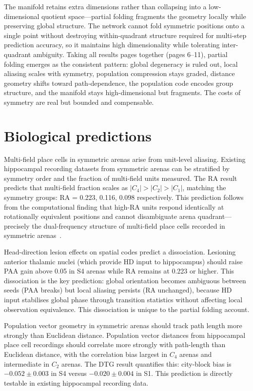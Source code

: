 \documentclass[11pt, a4paper]{article}
\begin{document}
\noindent The manifold retains extra dimensions rather than collapsing into a low-dimensional quotient space---partial folding fragments the geometry locally while preserving global structure. The network cannot fold symmetric positions onto a single point without destroying within-quadrant structure required for multi-step prediction accuracy, so it maintains high dimensionality while tolerating inter-quadrant ambiguity. Taking all results pages together (pages 6--11), partial folding emerges as the consistent pattern: global degeneracy is ruled out, local aliasing scales with symmetry, population compression stays graded, distance geometry shifts toward path-dependence, the population code encodes group structure, and the manifold stays high-dimensional but fragments. The costs of symmetry are real but bounded and compensable.

\clearpage

\section*{Biological predictions}

Multi-field place cells in symmetric arenas arise from unit-level aliasing. Existing hippocampal recording datasets from symmetric arenas can be stratified by symmetry order and the fraction of multi-field units measured. The RA result predicts that multi-field fraction scales as $|C_4| > |C_2| > |C_1|$, matching the symmetry groups: RA = 0.223, 0.116, 0.098 respectively. This prediction follows from the computational finding that high-RA units respond identically at rotationally equivalent positions and cannot disambiguate arena quadrant---precisely the dual-frequency structure of multi-field place cells recorded in symmetric arenas~\cite{muller1987, knierim1995}.

Head-direction lesion effects on spatial codes predict a dissociation. Lesioning anterior thalamic nuclei (which provide HD input to hippocampus) should raise PAA gain above 0.05 in S4 arenas while RA remains at 0.223 or higher. This dissociation is the key prediction: global orientation becomes ambiguous between seeds (PAA breaks) but local aliasing persists (RA unchanged), because HD input stabilises global phase through transition statistics without affecting local observation equivalence. This dissociation is unique to the partial folding account.

Population vector geometry in symmetric arenas should track path length more strongly than Euclidean distance. Population vector distances from hippocampal place cell recordings should correlate more strongly with path-length than Euclidean distance, with the correlation bias largest in $C_4$ arenas and intermediate in $C_2$ arenas. The DTG result quantifies this: city-block bias is $-0.052 \pm 0.003$ in S4 versus $-0.020 \pm 0.004$ in S1. This prediction is directly testable in existing hippocampal recording data.
\end{document}
